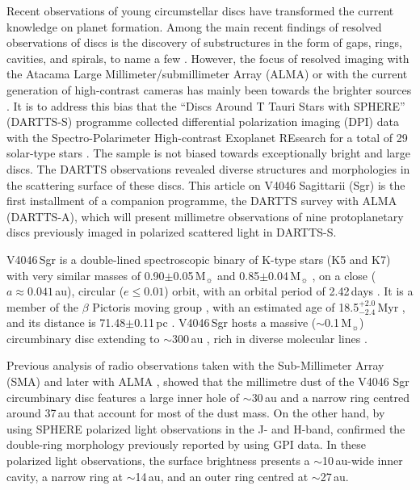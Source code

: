 \documentclass[fleqn,usenatbib,useAMS]{mnras}
\newcommand{\red}[1]{\textcolor{red}{#1}}
\begin{document}
Recent observations of young circumstellar discs have transformed the current knowledge on planet formation. Among the main recent findings of resolved observations of discs is the discovery of substructures in the form of gaps, rings, cavities, and spirals, to name a few \citep[see,][and references there in]{Andrews_2020_aug}. However, the focus of resolved imaging with the Atacama Large Millimeter/submillimeter Array (ALMA) or with the current generation of high-contrast cameras has mainly been towards the brighter sources \red{\citep[e.g.,][]{2017A&A...603A..21G}}. It is to address this bias that the ``Discs Around T Tauri Stars with SPHERE'' (DARTTS-S) programme collected differential polarization imaging (DPI) data with the Spectro-Polarimeter High-contrast Exoplanet REsearch \citep[SPHERE][]{2019A&A...631A.155B} for a total of 29 solar-type stars \citep[][]{Avenhaus_2018,Garufi2020}. The sample is not biased towards exceptionally bright and large discs. The DARTTS observations revealed diverse structures and morphologies in the scattering surface of these discs. This article on V4046 Sagittarii (Sgr) is the first installment of a companion programme, the DARTTS survey with ALMA (DARTTS-A), which will present millimetre observations of nine protoplanetary discs previously imaged in polarized scattered light in DARTTS-S.

V4046\,Sgr is a double-lined spectroscopic binary of K-type stars (K5 and K7) with very similar masses of 0.90$\pm$0.05\,M$_{\sun}$ and 0.85$\pm$0.04\,M$_{\sun}$ \citep{Rosenfeld_2012}, on a close ($a \approx 0.041$\,au), circular ($e\leq0.01$) orbit, with an orbital period of 2.42\,days \citep{2000IAUS..200P..28Q}. It is a member of the $\beta$ Pictoris moving group \citep{Zuckerman_2004}, with an estimated age of 18.5$^{+2.0}_{-2.4}$\,Myr \citep{2020A&A...642A.179M}, and its distance is 71.48$\pm$0.11\,pc \citep{gaiacollaboration2021gaia}. V4046\,Sgr hosts a massive ($\sim$0.1\,M$_{\sun}$) circumbinary disc extending to $\sim$300\,au \citep{Rosenfeld_2013, Rodriguez_2010}, rich in diverse molecular lines \citep{Kastner_2018}.

Previous analysis of radio observations taken with the Sub-Millimeter Array (SMA) \citep{Rosenfeld_2013} and later with ALMA \citep{Guzman_2017,Huang_2017,Bergner_2018,Kastner_2018}, showed that the millimetre dust of the V4046 Sgr circumbinary disc features a large inner hole of $\sim$30\,au and a narrow ring centred around 37\,au that account for most of the dust mass. On the other hand, by using SPHERE polarized light observations in the J- and H-band, \citet{Avenhaus_2018} confirmed the double-ring morphology previously reported by \citet{Rapson_2015} using GPI data. In these polarized light observations, the surface brightness presents a $\sim$10\,au-wide inner cavity, a narrow ring at $\sim$14\,au, and an outer ring centred at $\sim$27\,au.
\end{document}
